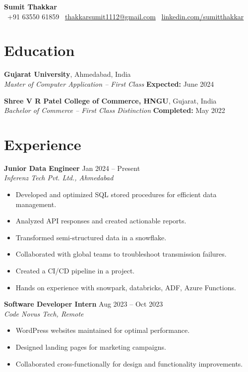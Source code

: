 \documentclass[11pt,a4paper]{article}
\begin{document}
\begin{center}
  {\Huge \textbf{Sumit Thakkar}}\\[8pt]
  \faPhone \ +91 63550 61859 \quad
  \faEnvelope \ \href{mailto:thakkarsumit1112@gmail.com}{thakkarsumit1112@gmail.com} \quad
  \faLinkedinSquare \ \href{https://linkedin.com/sumitthakkar}{linkedin.com/sumitthakkar}
\end{center}

\vspace{0.5cm}

\section*{Education}

\textbf{Gujarat University}, Ahmedabad, India \\
\textit{Master of Computer Application – First Class} \hfill \textbf{Expected:} June 2024

\vspace{0.2cm}

\textbf{Shree V R Patel College of Commerce, HNGU}, Gujarat, India \\
\textit{Bachelor of Commerce – First Class Distinction} \hfill \textbf{Completed:} May 2022

\section*{Experience}

\textbf{Junior Data Engineer} \hfill Jan 2024 – Present \\
\textit{Inferenz Tech Pvt. Ltd., Ahmedabad} 
\begin{itemize}
  \item Developed and optimized SQL stored procedures for efficient data management.
  \item Analyzed API responses and created actionable reports.
  \item Transformed semi-structured data in a snowflake.
  \item Collaborated with global teams to troubleshoot transmission failures.
  \item Created a CI/CD pipeline in a project.
  \item Hands on experience with snowpark, databricks, ADF, Azure Functions.
\end{itemize}

\textbf{Software Developer Intern} \hfill Aug 2023 – Oct 2023 \\
\textit{Code Novus Tech, Remote}
\begin{itemize}
  \item WordPress websites maintained for optimal performance.
  \item Designed landing pages for marketing campaigns.
  \item Collaborated cross-functionally for design and functionality improvements.
\end{itemize}
\end{document}

